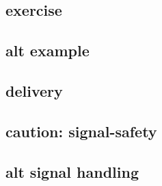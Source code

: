 

\subsection{exercise}


\subsection{alt example}


\subsection{delivery}



\subsection{caution: signal-safety}



\subsection{alt signal handling}



